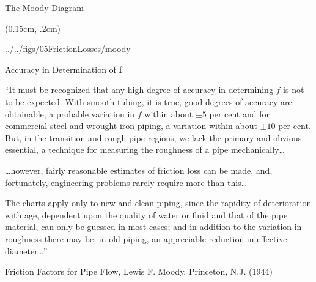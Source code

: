 \documentclass[9pt,xcolor=x11names,professionalfonts, mathserif]{beamer}
\begin{document}
\begin{frame}{The Moody Diagram}
	\begin{textblock*}{1\columnwidth}(0.15cm, .2cm)
		\begin{cfig}[0.6]{../../figs/05FrictionLosses/moody}\end{cfig}
	\end{textblock*}
\end{frame}

\begin{frame}{Accuracy in Determination of \textbf{f}}

		\begin{cmini}{
			``It must be recognized that any high degree of accuracy in determining $f$ is not to be expected. With smooth tubing, it is true,
			good degrees of accuracy are obtainable; a probable variation in $f$ within about $\pm5$ per cent and for commercial
			steel and wrought-iron piping, a variation within about $\pm10$ per cent. But, in the transition and rough-pipe regions, we lack the primary and obvious essential, a technique for measuring
			the roughness of a pipe mechanically\ldots
			\par\medskip
			\ldots however, fairly reasonable estimates of friction loss can be made, and, fortunately, engineering problems rarely require more than this\ldots
			\par\medskip
			The charts apply only to new and clean piping, since the rapidity of deterioration with age, dependent upon the quality of water or fluid and that
			of the pipe material, can only be guessed in most cases; and in addition to the variation in roughness there may be, in old piping, an appreciable reduction in effective
			diameter\ldots''
		}\end{cmini}

		\hfill{\footnotesize{Friction Factors for Pipe Flow, Lewis F. Moody, Princeton, N.J. (1944)}}
\end{frame}
\end{document}
